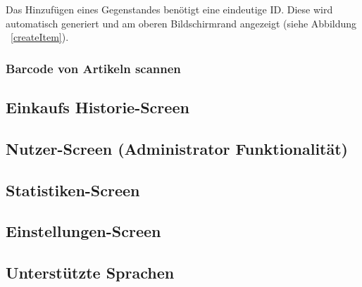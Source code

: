 Das Hinzufügen eines Gegenstandes benötigt eine eindeutige ID. Diese wird automatisch generiert und am oberen Bildschirmrand angezeigt (siehe Abbildung ~\ref{createItem}).


\subsubsection{Barcode von Artikeln scannen} \label{subsubsec:shop-admin-scan-item}


\subsection{Einkaufs Historie-Screen} \label{subsec:purchases-screen}


\subsection{Nutzer-Screen (Administrator Funktionalität)} \label{subsec:user-screen}

\subsection{Statistiken-Screen} \label{subsec:statistics-screen}

\subsection{Einstellungen-Screen} \label{subsec:settings-screen}

\subsection{Unterstützte Sprachen} \label{subsec:languages}
